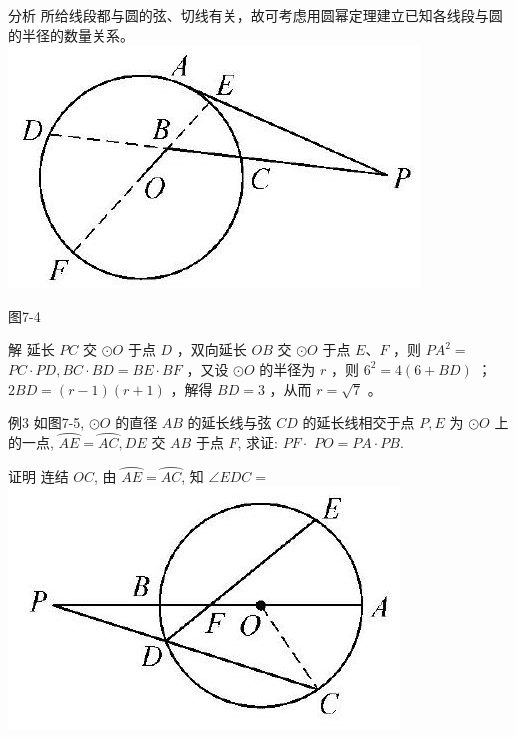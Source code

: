 \documentclass[10pt]{article}
\begin{document}
分析 所给线段都与圆的弦、切线有关，故可考虑用圆幂定理建立已知各线段与圆的半径的数量关系。\\
\includegraphics[max width=\textwidth, center]{2024_10_30_66b8e5e701da2093c133g-053(1)}

图7-4

解 延长 $P C$ 交 $\odot O$ 于点 $D$ ，双向延长 $O B$ 交 $\odot O$ 于点 $E 、 F$ ，则 $P A^{2}=$ $P C \cdot P D, B C \cdot B D=B E \cdot B F$ ，又设 $\odot O$ 的半径为 $r$ ，则 $6^{2}=4(6+B D)$ ； $2 B D=(r-1)(r+1)$ ，解得 $B D=3$ ，从而 $r=\sqrt{7}$ 。

例3 如图7-5, $\odot O$ 的直径 $A B$ 的延长线与弦 $C D$ 的延长线相交于点 $P, E$ 为 $\odot O$ 上的一点, $\overparen{A E}=\overparen{A C}, D E$ 交 $A B$ 于点 $F$, 求证: $P F \cdot$ $P O=P A \cdot P B$.

证明 连结 $O C$, 由 $\overparen{A E}=\overparen{A C}$, 知 $\angle E D C=$\\
\includegraphics[max width=\textwidth, center]{2024_10_30_66b8e5e701da2093c133g-053(2)}
\end{document}

